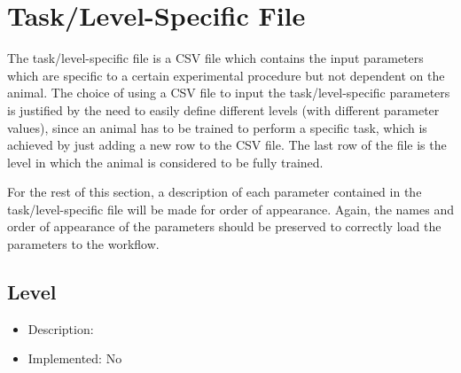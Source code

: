 


\section{Task/Level-Specific File}
\label{sec:task_specific}
The task/level-specific file is a CSV file which contains the input parameters which are specific to a certain experimental procedure but not dependent on the animal. The choice of using a CSV file to input the task/level-specific parameters is justified by the need to easily define different levels (with different parameter values), since an animal has to be trained to perform a specific task, which is achieved by just adding a new row to the CSV file. The last row of the file is the level in which the animal is considered to be fully trained.

For the rest of this section, a description of each parameter contained in the task/level-specific file will be made for order of appearance. Again, the names and order of appearance of the parameters should be preserved to correctly load the parameters to the workflow.

\subsection*{Level}
\begin{itemize}
	\item Description: 
	\item Implemented: No
\end{itemize}

